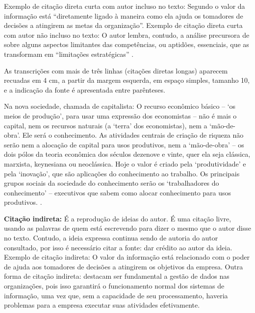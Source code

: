 Exemplo de citação direta curta com autor incluso no texto: Segundo  o valor da informação está “diretamente ligado à maneira como ela ajuda os tomadores de decisões a atingirem as metas da organização”. Exemplo de citação direta curta com autor não incluso no texto: O autor lembra, contudo, a análise precursora de  sobre alguns aspectos limitantes das competências, ou aptidões, essenciais, que as transformam em “limitações estratégicas” \cite{Pressman2009}.

As transcrições com mais de três linhas (citações diretas longas) aparecem recuadas em 4 cm, a partir da margem esquerda, em espaço simples, tamanho 10, e a indicação da fonte é apresentada entre parênteses.

\begin{citacao}
  Na nova sociedade, chamada de capitalista: O recurso econômico básico – ‘os meios de produção’, para usar uma expressão dos economistas – não é mais o capital, nem os recursos naturais (a ‘terra’ dos economistas), nem a ‘mão-de-obra’. Ele será o conhecimento. As atividades centrais de criação de riqueza não serão nem a alocação de capital para usos produtivos, nem a ‘mão-de-obra’ – os dois pólos da teoria econômica dos séculos dezenove e vinte, quer ela seja clássica, marxista, keynesiana ou neoclássica. Hoje o valor é criado pela ‘produtividade’ e pela ‘inovação’, que são aplicações do conhecimento ao trabalho. Os principais grupos sociais da sociedade do conhecimento serão os ‘trabalhadores do conhecimento’ – executivos que sabem como alocar conhecimento para usos produtivos. \cite[p. 48]{Pressman2009}.
\end{citacao}

\textbf{Citação indireta:} É a reprodução de ideias do autor. É uma citação livre, usando as palavras de quem está escrevendo para dizer o mesmo que o autor disse no texto. Contudo, a ideia expressa continua sendo de autoria do autor consultado, por isso é necessário citar a fonte: dar crédito ao autor da ideia. Exemplo de citação indireta: O valor da informação está relacionado com o poder de ajuda aos tomadores de decisões a atingirem os objetivos da empresa\cite{Pressman2009}. Outra forma de citação indireta:  destacam ser fundamental a gestão de dados nas organizações, pois isso garantirá o funcionamento normal dos sistemas de informação, uma vez que, sem a capacidade de seu processamento, haveria problemas para a empresa executar suas atividades efetivamente.

